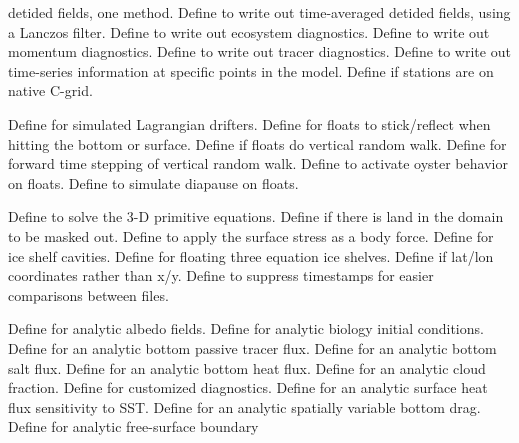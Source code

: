 \begin{klist}
\begin{klist}
  detided fields, one method.
        Define to write out time-averaged
  detided fields, using a Lanczos filter.
     Define to write out ecosystem diagnostics.
     Define to write out momentum diagnostics.
     Define to write out tracer diagnostics.
        Define to write out time-series
  information at specific points in the model.
        Define if stations are on native C-grid.
  \end{klist}
   \mbox{}
  \begin{klist}
        Define for simulated Lagrangian drifters.
      Define for floats to stick/reflect when
    hitting the bottom or surface.
      Define if floats do vertical random walk.
     Define for forward time stepping of vertical
  random walk.
      Define to activate oyster behavior on
  floats.
      Define to simulate diapause on floats.
  \end{klist}
   \mbox{}
  \begin{klist}
         Define to solve the 3-D primitive
  equations.
       Define if there is land in the domain to be
   masked out.
       Define to apply the surface
  stress as a body force.
        Define for ice shelf cavities.
      Define for floating three equation ice shelves.
       Define if lat/lon coordinates rather than x/y.
      Define to suppress timestamps for easier
    comparisons between files.
  \end{klist}
   \mbox{}
  \begin{klist}
      Define for analytic albedo fields.
     Define for analytic biology initial conditions.
      Define for an analytic bottom passive tracer flux.
      Define for an analytic bottom salt flux.
      Define for an analytic bottom heat flux.
       Define for an analytic cloud fraction.
        Define for customized diagnostics.
      Define for an analytic surface heat flux
  sensitivity to SST.
        Define for an analytic spatially variable
  bottom drag.
       Define for analytic free-surface boundary

\end{klist}
\end{klist}
